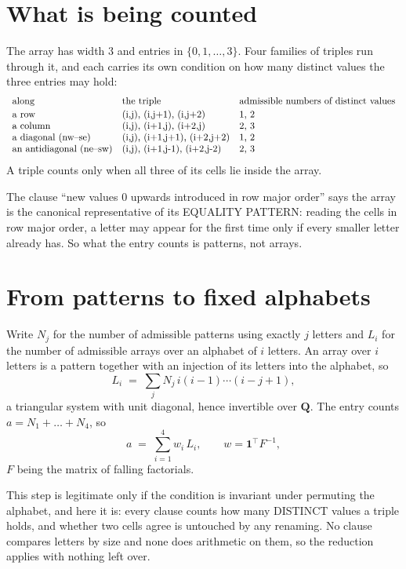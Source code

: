 \documentclass[11pt,a4paper]{article}
\theoremstyle{plain}
\theoremstyle{definition}
\begin{document}
\section{What is being counted}

The array has width $3$ and entries in $\{0,1,\dots,3\}$. Four families of triples
run through it, and each carries its own condition on how many distinct values the three
entries may hold:
\[
\begin{array}{lll}
\text{along} & \text{the triple} & \text{admissible numbers of distinct values} \\[2pt]
\text{a row} & $(i,j),\ (i,j+1),\ (i,j+2)$ & $1, 2$ \\
\text{a column} & $(i,j),\ (i+1,j),\ (i+2,j)$ & $2, 3$ \\
\text{a diagonal (nw--se)} & $(i,j),\ (i+1,j+1),\ (i+2,j+2)$ & $1, 2$ \\
\text{an antidiagonal (ne--sw)} & $(i,j),\ (i+1,j-1),\ (i+2,j-2)$ & $2, 3$ \\
\end{array}
\]
A triple counts only when all three of its cells lie inside the array.

The clause ``new values $0$ upwards introduced in row major order'' says the array is the
canonical representative of its EQUALITY PATTERN: reading the cells in row major order, a
letter may appear for the first time only if every smaller letter already has. So what the
entry counts is patterns, not arrays.

\section{From patterns to fixed alphabets}

Write $N_j$ for the number of admissible patterns using exactly $j$ letters and $L_i$ for the
number of admissible arrays over an alphabet of $i$ letters. An array over $i$ letters is a
pattern together with an injection of its letters into the alphabet, so
\[
L_i\;=\;\sum_j N_j\,i(i-1)\cdots(i-j+1),
\]
a triangular system with unit diagonal, hence invertible over $\mathbf{Q}$. The entry counts
$a=N_1+\dots+N_{4}$, so
\[
a\;=\;\sum_{i=1}^{4}w_i\,L_i ,\qquad w=\mathbf{1}^{\!\top}F^{-1},
\]
$F$ being the matrix of falling factorials.

This step is legitimate only if the condition is invariant under permuting the alphabet, and
here it is: every clause counts how many DISTINCT values a triple holds, and whether two cells
agree is untouched by any renaming. No clause compares letters by size and none does arithmetic
on them, so the reduction applies with nothing left over.
\end{document}
